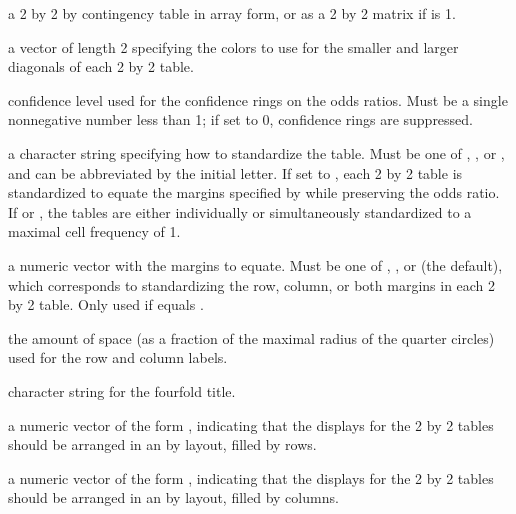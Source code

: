\begin{Arguments}
\begin{ldescription}
\item[\code{x}] a 2 by 2 by  contingency table in array form, or as a
2 by 2 matrix if  is 1.
\item[\code{color}] a vector of length 2 specifying the colors to use for the
smaller and larger diagonals of each 2 by 2 table.
\item[\code{conf.level}] confidence level used for the confidence rings on
the odds ratios.  Must be a single nonnegative number less than 1;
if set to 0, confidence rings are suppressed.
\item[\code{std}] a character string specifying how to standardize the table.
Must be one of , , or
, and can be abbreviated by the initial letter.
If set to , each 2 by 2 table is standardized to
equate the margins specified by  while preserving the
odds ratio.  If  or , the tables are
either individually or simultaneously standardized to a maximal cell
frequency of 1.
\item[\code{margin}] a numeric vector with the margins to equate.  Must be
one of , , or  (the default), which
corresponds to standardizing the row, column, or both margins in
each 2 by 2 table.
Only used if  equals .
\item[\code{space}] the amount of space (as a fraction of the maximal radius
of the quarter circles) used for the row and column labels.
\item[\code{main}] character string for the fourfold title.
\item[\code{mfrow}] a numeric vector of the form , indicating
that the displays for the 2 by 2 tables should be arranged in an
 by  layout, filled by rows.
\item[\code{mfcol}] a numeric vector of the form , indicating
that the displays for the 2 by 2 tables should be arranged in an
 by  layout, filled by columns.
\end{ldescription}
\end{Arguments}
%
